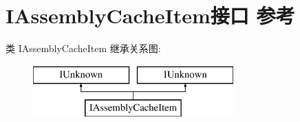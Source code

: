 \hypertarget{interface_i_assembly_cache_item}{}\section{I\+Assembly\+Cache\+Item接口 参考}
\label{interface_i_assembly_cache_item}
类 I\+Assembly\+Cache\+Item 继承关系图\+:\begin{figure}[H]
\begin{center}
\leavevmode
\includegraphics[height=2.000000cm]{interface_i_assembly_cache_item}
\end{center}
\end{figure}
